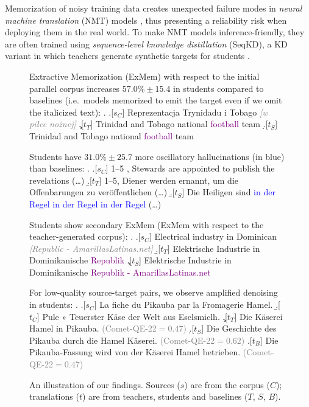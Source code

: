 Memorization of noisy training data creates unexpected failure modes in \textit{neural machine translation} (NMT) models \citep{raunak2022finding}, thus presenting a reliability risk when deploying them in the real world.
To make NMT models inference-friendly, \citep[e.g.,][]{bapna2022building,costa2022no} they are often trained using \textit{sequence-level knowledge distillation} (SeqKD), a KD \citep{hinton2015distilling} variant in which teachers generate synthetic targets for students \citep{kim-rush-2016-sequence}.
\begin{figure}[!h]
\begin{framed}
{\small
\setlength{\Extopsep}{0.5em}
\setlength{\Exlabelsep}{0.75em}
\setlength{\Exlabelwidth}{.75em}
\setlength{\SubExleftmargin}{1.2em}

\noindent \tcbox[colback=pink]{\frownie{}} Extractive Memorization (ExMem) with respect to the initial parallel corpus increases $57.0\%{\pm}15.4$ in students compared to baselines (i.e.\ models memorized to emit the target even if we omit the italicized text):
\ex. \label{ex1}
\a.[$s_C$] Reprezentacja Trynidadu i Tobago \textit{\textcolor{gray}{[w piłce \vfill nożnej]}}
\c.[$t_T$] Trinidad and Tobago national \textcolor{purple}{football} team
\d.[$t_S$] Trinidad and Tobago national \textcolor{purple}{football} team

\noindent \tcbox[colback=pink]{\frownie{}} Students have $31.0\%{\pm}25.7$ more oscillatory hallucinations (in blue) than baselines:
\ex. \label{ex3}
\a.[$s_C$] 1–5 , Stewards are appointed to publish the revelations (\dots)
\b.[$t_T$] 1–5, Diener werden ernannt, um die Offenbarungen zu veröffentlichen (\dots)
\b.[$t_S$] Die Heiligen sind \textcolor{blue}{in der Regel in der Regel in der Regel} (\dots)

\noindent \tcbox[colback=pink]{\frownie{}} Students show secondary ExMem (ExMem with respect to the teacher-generated corpus):
\ex. \label{ex2}
\a.[$s_C$] Electrical industry in Dominican \textit{\textcolor{gray}{[Republic - AmarillasLatinas.net]}}
\b.[$t_T$] Elektrische Industrie in Dominikanische \textcolor{purple}{Republik}
\c.[$t_S$] Elektrische Industrie in Dominikanische \textcolor{purple}{Republik - AmarillasLatinas.net}

\tcbox[colback=lime]{\smiley{}} For low-quality source-target pairs, we observe amplified denoising in students:
\noindent 
\ex. \label{ex4}
\a.[$s_C$] La fiche du Pikauba par la Fromagerie Hamel.
\b.[$t_C$] Pule » Teuerster Käse der Welt aus Eselsmiclh.
\c.[$t_T$] Die Käserei Hamel in Pikauba. \textcolor{gray}{\small (Comet-QE-22${=}0.47$)}
\d.[$t_S$] Die Geschichte des Pikauba durch die Hamel Käserei. \textcolor{gray}{\small (Comet-QE-22${=}0.62$)}
\e.[$t_B$] Die Pikauba-Fassung wird von der Käserei Hamel betrieben. \textcolor{gray}{\small (Comet-QE-22${=}0.47$)}

\vspace{-0.4cm}
}
\end{framed}
\caption{An illustration of our findings. Sources ($s$) are from the corpus ($C$); translations ($t$) are from teachers, students and baselines ($T$, $S$, $B$).}
\vspace{-0.2cm}
\end{figure}

